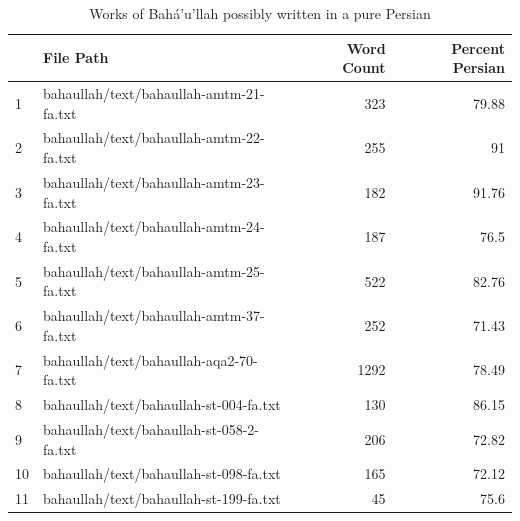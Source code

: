 \documentclass[12pt, oneside]{report}
\begin{document}
\begin{table}[]
	\centering
	\begin{tabular}{|l|l|r|r|}
		\hline
		\rowcolor[HTML]{EFEFEF}
		\textbf{} & \textbf{File Path}                       & \textbf{Word Count}         & \textbf{Percent Persian}      \\ \hline
		1         & bahaullah/text/bahaullah-amtm-21-fa.txt  & \cellcolor[HTML]{FFFFFF}323 & \cellcolor[HTML]{FFFFFF}79.88 \\ \hline
		\rowcolor[HTML]{EFEFEF}
		2         & bahaullah/text/bahaullah-amtm-22-fa.txt  & 255                         & 91                            \\ \hline
		\rowcolor[HTML]{FFFFFF}
		3         & bahaullah/text/bahaullah-amtm-23-fa.txt  & 182                         & 91.76                         \\ \hline
		\rowcolor[HTML]{EFEFEF}
		4         & bahaullah/text/bahaullah-amtm-24-fa.txt  & 187                         & 76.5                          \\ \hline
		\rowcolor[HTML]{FFFFFF}
		5         & bahaullah/text/bahaullah-amtm-25-fa.txt  & 522                         & 82.76                         \\ \hline
		\rowcolor[HTML]{EFEFEF}
		6         & bahaullah/text/bahaullah-amtm-37-fa.txt  & 252                         & 71.43                         \\ \hline
		\rowcolor[HTML]{FFFFFF}
		7         & bahaullah/text/bahaullah-aqa2-70-fa.txt  & 1292                        & 78.49                         \\ \hline
		\rowcolor[HTML]{EFEFEF}
		8         & bahaullah/text/bahaullah-st-004-fa.txt   & 130                         & 86.15                         \\ \hline
		\rowcolor[HTML]{FFFFFF}
		9         & bahaullah/text/bahaullah-st-058-2-fa.txt & 206                         & 72.82                         \\ \hline
		\rowcolor[HTML]{EFEFEF}
		10        & bahaullah/text/bahaullah-st-098-fa.txt   & 165                         & 72.12                         \\ \hline
		\rowcolor[HTML]{FFFFFF}
		11        & bahaullah/text/bahaullah-st-199-fa.txt   & 45                          & 75.6                          \\ \hline
	\end{tabular}
	\caption{Works of Bah\'{a}'u'llah possibly written in a pure Persian }
	\label{tab:pure-persian}
\end{table}
\end{document}
